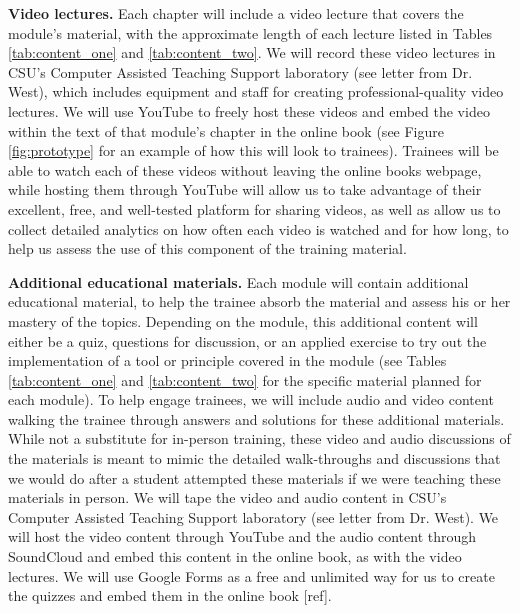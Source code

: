 \documentclass[pdftex,english,11pt,parskip=half]{scrartcl}
\begin{document}
\textbf{Video lectures.} Each chapter will include a video lecture that covers the module's material, with the approximate length of each lecture listed in Tables \ref{tab:content_one} and \ref{tab:content_two}. We will record these video lectures in CSU's Computer Assisted Teaching Support laboratory (see letter from Dr. West), which includes equipment and staff for creating professional-quality video lectures. We will use YouTube to freely host these videos and embed the video within the text of that module's chapter in the online book (see Figure \ref{fig:prototype} for an example of how this will look to trainees). Trainees will be able to watch each of these videos without leaving the online books webpage, while hosting them through YouTube will allow us to take advantage of their excellent, free, and well-tested platform for sharing videos, as well as allow us to collect detailed analytics on how often each video is watched and for how long, to help us assess the use of this component of the training material. 

\textbf{Additional educational materials.} Each module will contain additional educational material, to help the trainee absorb the material and assess his or her mastery of the topics. Depending on the module, this additional content will either be a quiz, questions for discussion, or an applied exercise to try out the implementation of a tool or principle covered in the module (see Tables \ref{tab:content_one} and \ref{tab:content_two} for the specific material planned for each module). To help engage trainees, we will include audio and video content walking the trainee through answers and solutions for these additional materials. While not a substitute for in-person training, these video and audio discussions of the materials is meant to mimic the detailed walk-throughs and discussions that we would do after a student attempted these materials if we were teaching these materials in person. We will tape the video and audio content in CSU's Computer Assisted Teaching Support laboratory (see letter from Dr. West). We will host the video content through YouTube and the audio content through SoundCloud and embed this content in the online book, as with the video lectures. We will use Google Forms as a free and unlimited way for us to create the quizzes and embed them in the online book [ref].
\end{document}
